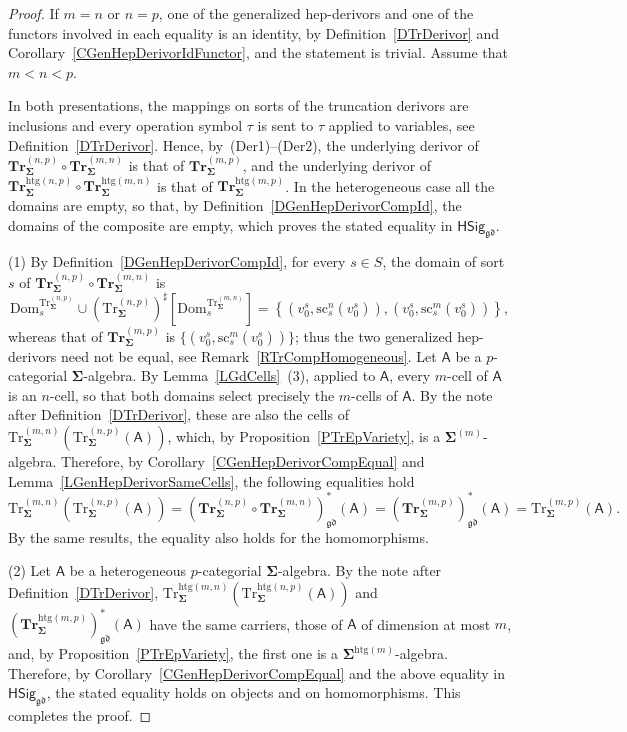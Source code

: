 \documentclass[a4paper, reqno]{amsbook}
\newcommand{\sig}[1]{\mathbf{#1}}             %
\newcommand{\calg}[1]{\boldsymbol{\mathsf{#1}}} %
\newcommand{\Dom}{\mathrm{Dom}}
\newcommand{\gd}{\mathfrak{gd}}              %
\newcommand{\htg}{\mathrm{htg}}                %
\newcommand{\src}{\mathrm{sc}}
\newcommand{\Tr}{\mathrm{Tr}}
\newcommand{\bTr}{\mathbf{Tr}}
\theoremstyle{plain}
\theoremstyle{definition}
\begin{document}
\begin{proof}
If $m=n$ or $n=p$, one of the generalized hep-derivors and one of the functors involved in each equality is an identity, by Definition~\ref{DTrDerivor} and Corollary~\ref{CGenHepDerivorIdFunctor}, and the statement is trivial.
Assume that $m<n<p$.

In both presentations, the mappings on sorts of the truncation derivors are inclusions and every operation symbol $\tau$ is sent to $\tau$ applied to variables, see Definition~\ref{DTrDerivor}.
Hence, by~(Der1)--(Der2), the underlying derivor of $\bTr^{(n,p)}_{\sig{\Sigma}}\circ\bTr^{(m,n)}_{\sig{\Sigma}}$ is that of $\bTr^{(m,p)}_{\sig{\Sigma}}$, and the underlying derivor of $\bTr^{\htg(n,p)}_{\sig{\Sigma}}\circ\bTr^{\htg(m,n)}_{\sig{\Sigma}}$ is that of $\bTr^{\htg(m,p)}_{\sig{\Sigma}}$.
In the heterogeneous case all the domains are empty, so that, by Definition~\ref{DGenHepDerivorCompId}, the domains of the composite are empty, which proves the stated equality in $\mathsf{HSig}_{\gd}$.

(1) By Definition~\ref{DGenHepDerivorCompId}, for every $s\in S$, the domain of sort $s$ of $\bTr^{(n,p)}_{\sig{\Sigma}}\circ\bTr^{(m,n)}_{\sig{\Sigma}}$ is
\[
\Dom^{\Tr^{(n,p)}_{\sig{\Sigma}}}_{s}\cup\left(\Tr^{(n,p)}_{\sig{\Sigma}}\right)^{\sharp}\left[\Dom^{\Tr^{(m,n)}_{\sig{\Sigma}}}_{s}\right]
=
\left\lbrace\left(v^s_0,\src^n_s(v^s_0)\right),\left(v^s_0,\src^m_s(v^s_0)\right)\right\rbrace,
\]
whereas that of $\bTr^{(m,p)}_{\sig{\Sigma}}$ is $\{(v^s_0,\src^m_s(v^s_0))\}$; thus the two generalized hep-derivors need not be equal, see Remark~\ref{RTrCompHomogeneous}.
Let $\calg{A}$ be a $p$-categorial $\sig{\Sigma}$-algebra.
By Lemma~\ref{LGdCells}~(3), applied to $\calg{A}$, every $m$-cell of $\calg{A}$ is an $n$-cell, so that both domains select precisely the $m$-cells of $\calg{A}$.
By the note after Definition~\ref{DTrDerivor}, these are also the cells of $\Tr^{(m,n)}_{\sig{\Sigma}}(\Tr^{(n,p)}_{\sig{\Sigma}}(\calg{A}))$, which, by Proposition~\ref{PTrEpVariety}, is a $\sig{\Sigma}^{(m)}$-algebra.
Therefore, by Corollary~\ref{CGenHepDerivorCompEqual} and Lemma~\ref{LGenHepDerivorSameCells}, the following equalities hold
$$
\Tr^{(m,n)}_{\sig{\Sigma}}\left(\Tr^{(n,p)}_{\sig{\Sigma}}(\calg{A})\right)
=
\left(\bTr^{(n,p)}_{\sig{\Sigma}}\circ\bTr^{(m,n)}_{\sig{\Sigma}}\right)^{\ast}_{\gd}(\calg{A})
=
\left(\bTr^{(m,p)}_{\sig{\Sigma}}\right)^{\ast}_{\gd}(\calg{A})
=
\Tr^{(m,p)}_{\sig{\Sigma}}(\calg{A}).
$$
By the same results, the equality also holds for the homomorphisms.

(2) Let $\calg{A}$ be a heterogeneous $p$-categorial $\sig{\Sigma}$-algebra.
By the note after Definition~\ref{DTrDerivor}, $\Tr^{\htg(m,n)}_{\sig{\Sigma}}(\Tr^{\htg(n,p)}_{\sig{\Sigma}}(\calg{A}))$ and $(\bTr^{\htg(m,p)}_{\sig{\Sigma}})^{\ast}_{\gd}(\calg{A})$ have the same carriers, those of $\calg{A}$ of dimension at most $m$, and, by Proposition~\ref{PTrEpVariety}, the first one is a $\sig{\Sigma}^{\htg(m)}$-algebra.
Therefore, by Corollary~\ref{CGenHepDerivorCompEqual} and the above equality in $\mathsf{HSig}_{\gd}$, the stated equality holds on objects and on homomorphisms. This completes the proof.
\end{proof}
\end{document}
